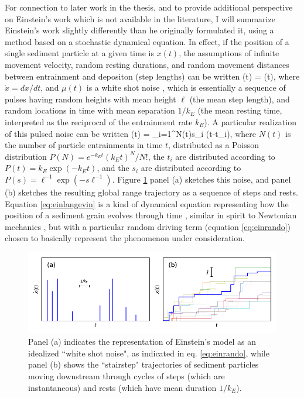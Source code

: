 For connection to later work in the thesis, and to provide additional perspective on Einstein's work which is not available in the literature, I will summarize Einstein's work slightly differently than he originally formulated it, using a method based on a stochastic dynamical equation.
In effect, if the position of a single sediment particle at a given time is $x(t)$, the assumptions of infinite movement velocity, random resting durations, and random movement distances between entrainment and depositon (step lengths) can be written
\be {}(t) = \mu(t), \label{eq:einlangevin}\ee
where $\dot{x} = dx/dt$, and $\mu(t)$ is a white shot noise \citep{VanDenBroeck1983}, which is essentially a sequence of pulses having random heights with mean height $\ell$ (the mean step length), and random locations in time with mean separation $1/k_E$ (the mean resting time, interpreted as the reciprocal of the entrainment rate $k_E$).
A particular realization of this pulsed noise can be written
\be \mu(t) = \sum_{i=1}^{N(t)}s_i \delta(t-t_i), \label{eq:einrando} \ee
where $N(t)$ is the number of particle entrainments in time $t$, distributed as a Poisson distribution $P(N) = e^{-k_E t} (k_E t)^N/N!$, the $t_i$ are distributed according to $P(t) = k_E\exp(-k_E t)$, and the $s_i$ are distributed according to $P(s) = \ell^{-1}\exp(-s \ell^{-1}).$
Figure \ref{fig:einsteinfig} panel (a) sketches this noise, and panel (b) sketches the resulting global range trajectory as a sequence of steps and rests.
Equation \ref{eq:einlangevin} is a kind of dynamical equation representing how the position of a sediment grain evolves through time \citep{Kubo1978}, similar in spirit to Newtonian mechanics \citep{Goldstein1956}, but with a particular random driving term (equation \ref{eq:einrando}) chosen to basically represent the phenomenon under consideration.

\begin{figure}[!htbp]
	\includegraphics[width=\linewidth,keepaspectratio]{./figures/ch1/einsteinConcept.pdf}
	\caption{Panel (a) indicates the representation of Einstein's model as an idealized ``white shot noise", as indicated in eq. \ref{eq:einrando}, while panel (b) shows the ``stairstep" trajectories of sediment particles moving downstream through cycles of steps (which are instantaneous) and rests (which have mean duration $1/k_E$). }
	\label{fig:einsteinfig}
\end{figure}

